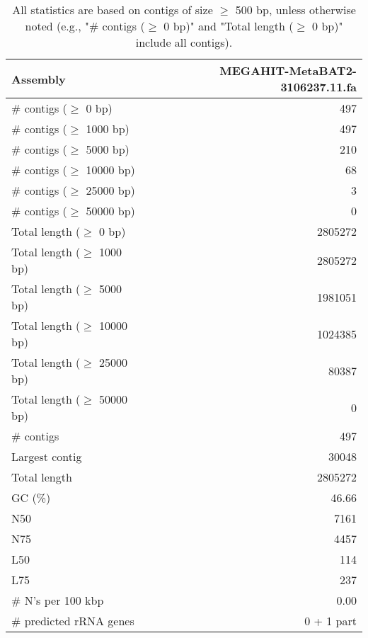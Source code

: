 \documentclass[12pt,a4paper]{article}
\begin{document}
\begin{table}[ht]
\begin{center}
\caption{All statistics are based on contigs of size $\geq$ 500 bp, unless otherwise noted (e.g., "\# contigs ($\geq$ 0 bp)" and "Total length ($\geq$ 0 bp)" include all contigs).}
\begin{tabular}{|l*{1}{|r}|}
\hline
Assembly & MEGAHIT-MetaBAT2-3106237.11.fa \\ \hline
\# contigs ($\geq$ 0 bp) & 497 \\ \hline
\# contigs ($\geq$ 1000 bp) & 497 \\ \hline
\# contigs ($\geq$ 5000 bp) & 210 \\ \hline
\# contigs ($\geq$ 10000 bp) & 68 \\ \hline
\# contigs ($\geq$ 25000 bp) & 3 \\ \hline
\# contigs ($\geq$ 50000 bp) & 0 \\ \hline
Total length ($\geq$ 0 bp) & 2805272 \\ \hline
Total length ($\geq$ 1000 bp) & 2805272 \\ \hline
Total length ($\geq$ 5000 bp) & 1981051 \\ \hline
Total length ($\geq$ 10000 bp) & 1024385 \\ \hline
Total length ($\geq$ 25000 bp) & 80387 \\ \hline
Total length ($\geq$ 50000 bp) & 0 \\ \hline
\# contigs & 497 \\ \hline
Largest contig & 30048 \\ \hline
Total length & 2805272 \\ \hline
GC (\%) & 46.66 \\ \hline
N50 & 7161 \\ \hline
N75 & 4457 \\ \hline
L50 & 114 \\ \hline
L75 & 237 \\ \hline
\# N's per 100 kbp & 0.00 \\ \hline
\# predicted rRNA genes & 0 + 1 part \\ \hline
\end{tabular}
\end{center}
\end{table}
\end{document}
